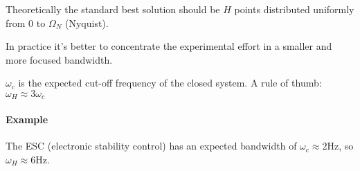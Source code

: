 \begin{remark}[Frequency bandwidth selection $\omega_H =\; ?$]
    Theoretically the standard best solution should be $H$ points distributed uniformly from 0 to $\Omega_N$ (Nyquist).

    In practice it's better to concentrate the experimental effort in a smaller and more focused bandwidth.

    \begin{figure}[H]
        \centering
    \end{figure}

    $\omega_c$ is the expected cut-off frequency of the closed system.
    A rule of thumb: $\omega_H \approx 3\omega_c$

    \paragraph{Example} The ESC (electronic stability control) has an expected bandwidth of $\omega_c \approx 2 \text{Hz}$, so $\omega_H \approx 6\text{Hz}$.
\end{remark}
